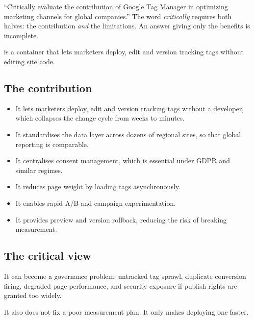 \documentclass{MMTextbook}
\begin{document}
\begin{keybox}
``Critically evaluate the contribution of Google Tag Manager in optimizing
marketing channels for global companies.''
The word \emph{critically} requires both halves: the contribution \emph{and} the
limitations. An answer giving only the benefits is incomplete.
\end{keybox}

\begin{definitionbox}
 is a container that lets
marketers deploy, edit and version tracking tags without editing site code.
\end{definitionbox}

\subsection{The contribution}

\begin{itemize}
\item It lets marketers deploy, edit and version tracking tags without a
      developer, which collapses the change cycle from weeks to minutes.
\item It standardises the data layer across dozens of regional sites, so that
      global reporting is comparable.
\item It centralises consent management, which is essential under GDPR and
      similar regimes.
\item It reduces page weight by loading tags asynchronously.
\item It enables rapid A/B and campaign experimentation.
\item It provides preview and version rollback, reducing the risk of breaking
      measurement.
\end{itemize}

\subsection{The critical view}

\begin{warnbox}
It can become a governance problem: untracked tag sprawl, duplicate conversion
firing, degraded page performance, and security exposure if publish rights are
granted too widely.

\smallskip
It also does not fix a poor measurement plan. It only makes deploying one
faster.
\end{warnbox}
\end{document}
